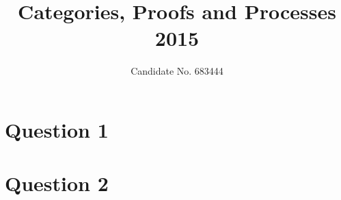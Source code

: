 \documentclass{tufte-handout}
\title{Categories, Proofs and Processes 2015}
\author{Candidate No. 683444}
\theoremstyle{definition}
\numberwithin{definition}{section}
\theoremstyle{plain}
\numberwithin{prop}{section}
\theoremstyle{plain}
\numberwithin{lemma}{section}
\begin{document}
\maketitle

\section{Question 1}\label{sec:q-1}


\section{Question 2}\label{sec:q-2}

\end{document}
